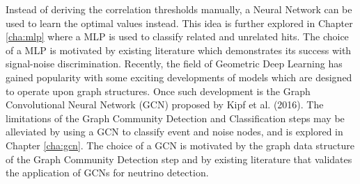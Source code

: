 Instead of deriving the correlation thresholds manually, a Neural
Network can be used to learn the optimal values instead. This idea is
further explored in Chapter \ref{cha:mlp} where a MLP is used to
classify related and unrelated hits. The choice of a MLP is motivated
by existing literature which demonstrates its success with
signal-noise discrimination. Recently, the field of Geometric Deep
Learning has gained popularity with some exciting developments of
models which are designed to operate upon graph structures. Once such
development is the Graph Convolutional Neural Network (GCN) proposed
by Kipf et al. (2016). The limitations of the Graph Community
Detection and Classification steps may be alleviated by using a GCN to
classify event and noise nodes, and is explored in Chapter
\ref{cha:gcn}. The choice of a GCN is motivated by the graph data
structure of the Graph Community Detection step and by existing
literature that validates the application of GCNs for neutrino
detection.
